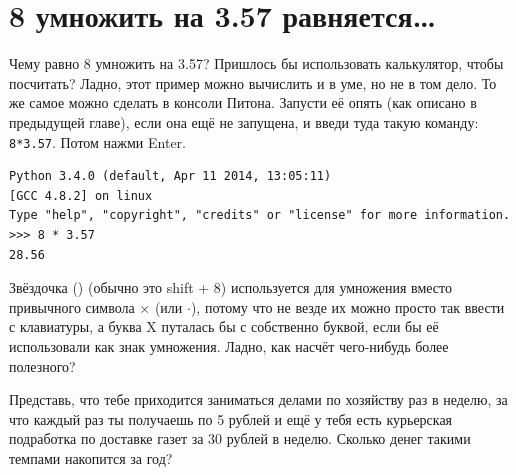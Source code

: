 %
%
%

\chapter{8 умножить на 3.57 равняется…}\label{ch:8multipliedby3.57}

Чему равно 8 умножить на 3.57? Пришлось бы использовать калькулятор, чтобы посчитать? Ладно, этот пример можно вычислить и в уме, но не в том дело. То же самое можно сделать в консоли Питона. Запусти её опять (как описано в предыдущей главе), если она ещё не запущена, и введи туда такую команду: \texttt{8*3.57}. Потом нажми Enter.

\begin{verbatim}
Python 3.4.0 (default, Apr 11 2014, 13:05:11) 
[GCC 4.8.2] on linux
Type "help", "copyright", "credits" or "license" for more information.
>>> 8 * 3.57
28.56
\end{verbatim}

Звёздочка (\code{*}) (обычно это shift + 8) используется для умножения вместо привычного символа $×$ (или $\cdot$), потому что не везде их можно просто так ввести с клавиатуры, а буква X путалась бы с собственно буквой, если бы её использовали как знак умножения. Ладно, как насчёт чего-нибудь более полезного?

Представь, что тебе приходится заниматься делами по хозяйству раз в неделю, за что каждый раз ты получаешь по 5 рублей и ещё у тебя есть курьерская подработка по доставке газет за 30 рублей в неделю. Сколько денег такими темпами накопится за год?

